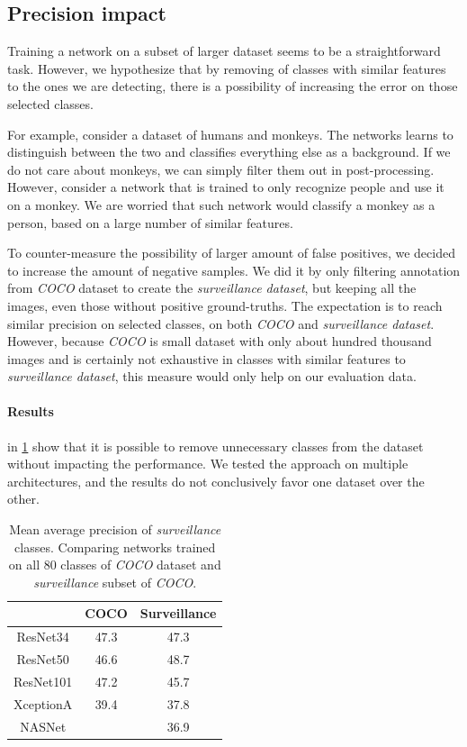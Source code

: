 \subsection{Precision impact}
Training a network on a subset of larger dataset seems to be a straightforward task. However, we hypothesize that by removing of classes with similar features to the ones we are detecting, there is a possibility of increasing the error on those selected classes. 

For example, consider a dataset of humans and monkeys. The networks learns to distinguish between the two and classifies everything else as a background. If we do not care about monkeys, we can simply filter them out in post-processing. However, consider a network that is trained to only recognize people and use it on a monkey. We are worried that such network would classify a monkey as a person, based on a large number of similar features. 

To counter-measure the possibility of larger amount of false positives, we decided to increase the amount of negative samples. We did it by only filtering annotation from \textit{COCO} dataset to create the \textit{surveillance dataset}, but keeping all the images, even those without positive ground-truths. The expectation is to reach similar precision on selected classes, on both \textit{COCO} and \textit{surveillance dataset}. However, because \textit{COCO} is small dataset with only about hundred thousand images and is certainly not exhaustive in classes with similar features to \textit{surveillance dataset}, this measure would only help on our evaluation data.

\paragraph{Results} in \cref{tab:ssdcocosurv} show that it is possible to remove unnecessary classes from the dataset without impacting the performance. We tested the approach on multiple architectures, and the results do not conclusively favor one dataset over the other. 

\begin{table}[]
    \centering
    \begin{tabular}{c|c|c}
         & COCO & Surveillance  \\
         \hline
        ResNet34 & 47.3 & 47.3 \\
        ResNet50 & 46.6 & 48.7 \\
        ResNet101 & 47.2 & 45.7 \\
        XceptionA & 39.4 & 37.8 \\
        NASNet & & 36.9 
    \end{tabular}
    \caption[SSD's precision comparison between COCO and surveillance datasets]{Mean average precision of \textit{surveillance} classes. Comparing networks trained on all 80 classes of \textit{COCO} dataset and \textit{surveillance} subset of \textit{COCO}.}
    \label{tab:ssdcocosurv}
\end{table}

